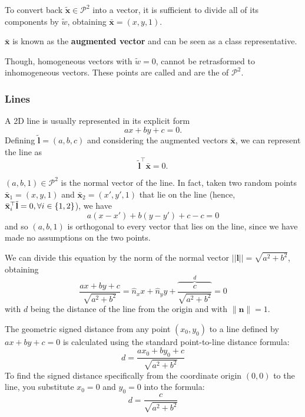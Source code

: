 To convert back $\tilde{\mathbf{x}}\in \mathcal{P}^2$ into a  vector, it is sufficient to divide all of its components by $\tilde{w}$, obtaining $\bar{\mathbf{x}} = (x, y, 1)$. 

\begin{definition}{}
    $\bar{\mathbf{x}}$ is known as the \textbf{augmented vector} and can be seen as a class representative.
\end{definition}

Though, homogeneous vectors with $\tilde{w}=0$, cannot be retrasformed to inhomogeneous vectors. These points are called  and are the  of $\mathcal{P}^2$.

\subsubsection{Lines}
A 2D line is usually represented in its explicit form
$$ax+by+c = 0.$$
Defining $\tilde{\mathbf{l}}=(a,b,c)$ and considering the augmented vectors $\bar{\mathbf{x}}$, we can represent the line as
$$\tilde{\mathbf{l}}^{\top}\bar{\mathbf{x}}=0.$$

\begin{observation}{}
$(a,b,1)\in \mathcal{P}^2$ is the normal vector of the line. In fact, taken two random points $\bar{\mathbf{x}}_{1}=(x,y,1)$ and $\bar{\mathbf{x}}_{2}=(x',y',1)$ that lie on the line (hence, $\bar{\mathbf{x}}_{i}^{\top}\tilde{\mathbf{l}}=0, \forall i\in\set{1,2}$), we have
$$a(x - x') + b(y - y') + c - c=0$$ and so $(a,b,1)$ is orthogonal to every vector that lies on the line, since we have made no assumptions on the two points.
\end{observation}

We can divide this equation by the norm of the normal vector $||\mathbf{l}||=\sqrt{a^2 + b^2}$, obtaining
$$\frac{ax + by + c}{\sqrt{a^2 + b^2}}=\hat{n}_{x} x + \hat{n}_{y} y + \overbrace{\frac{c}{\sqrt{a^2 + b^2}}}^{d}=0$$
with $d$ being the distance of the line from the origin and with $\| \mathbf{n} \|=1$.

\begin{observation}{}
    The geometric signed distance from any point $(x_0, y_0)$ to a line defined by $ax + by + c = 0$ is calculated using the standard point-to-line distance formula:
    $$d = \frac{ax_0 + by_0 + c}{\sqrt{a^2 + b^2}}$$
    To find the signed distance specifically from the coordinate origin $(0,0)$ to the line, you substitute $x_0 = 0$ and $y_0 = 0$ into the formula:
    $$d = \frac{c}{\sqrt{a^2 + b^2}}$$
\end{observation}

